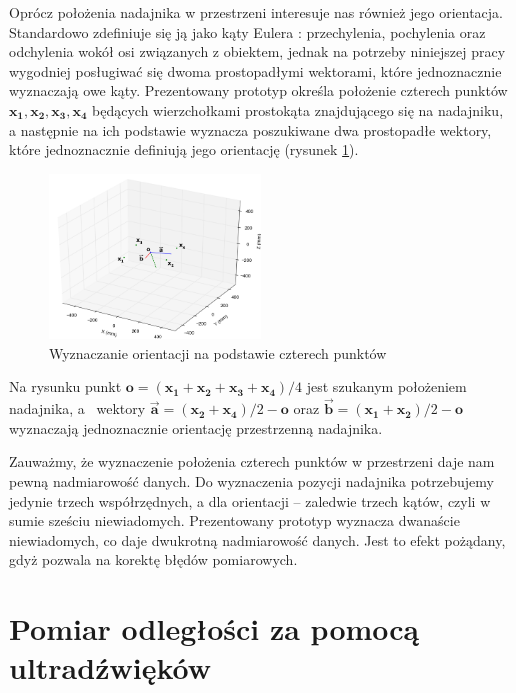 Oprócz położenia nadajnika w przestrzeni interesuje nas również jego orientacja.
Standardowo zdefiniuje się ją jako kąty Eulera \cite{bib:katyEulera}: przechylenia, 
pochylenia oraz odchylenia wokół osi związanych z obiektem, jednak na potrzeby niniejszej pracy wygodniej 
posługiwać się dwoma prostopadłymi wektorami, które jednoznacznie wyznaczają owe kąty. 
Prezentowany prototyp określa położenie czterech punktów $\boldsymbol{x_1, x_2, x_3, x_4}$ będących wierzchołkami prostokąta 
znajdującego się na nadajniku, a następnie na ich podstawie wyznacza poszukiwane dwa prostopadłe wektory, które jednoznacznie
definiują jego orientację (rysunek \ref{fig:orientacja}).
 \begin{figure}[H]
    \centering
    \includegraphics[width=0.5\textwidth, trim= 0mm 0mm 0mm 0mm,clip]{orientacja}
    \caption{Wyznaczanie orientacji na podstawie czterech punktów}
    \label{fig:orientacja}
\end{figure}
Na rysunku punkt $\boldsymbol{o} = (\boldsymbol{x_1} + \boldsymbol{x_2} + \boldsymbol{x_3} + \boldsymbol{x_4})/4$ jest szukanym położeniem
nadajnika, a~ wektory $\boldsymbol{\overrightarrow{a}} = (\boldsymbol{x_2} + \boldsymbol{x_4})/2 - \boldsymbol{o}$ oraz 
$\boldsymbol{\overrightarrow{b}} = (\boldsymbol{x_1} + \boldsymbol{x_2})/2 - \boldsymbol{o}$ wyznaczają jednoznacznie
orientację przestrzenną nadajnika.

Zauważmy, że wyznaczenie położenia czterech punktów w przestrzeni daje nam pewną nadmiarowość
danych. Do wyznaczenia pozycji nadajnika potrzebujemy jedynie trzech współrzędnych,
a dla orientacji -- zaledwie trzech kątów, czyli w sumie sześciu niewiadomych.
Prezentowany prototyp wyznacza  dwanaście niewiadomych, co daje dwukrotną nadmiarowość danych.
Jest to efekt pożądany, gdyż pozwala na korektę błędów pomiarowych.


\section{Pomiar odległości za pomocą ultradźwięków}

